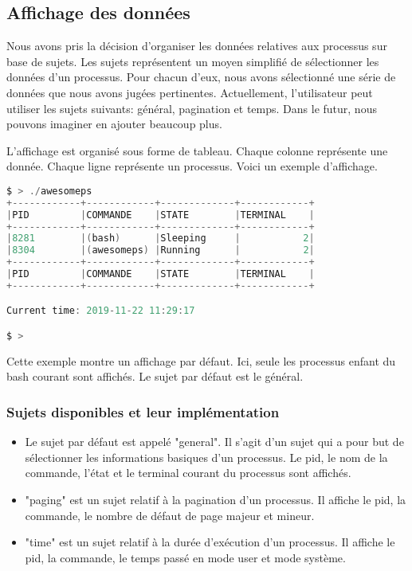 \subsection{Affichage des données}
Nous avons pris la décision d'organiser les données relatives aux processus sur base de sujets. Les sujets représentent un moyen simplifié de sélectionner les données d'un processus. Pour chacun d'eux, nous avons sélectionné une série de données que nous avons jugées pertinentes. Actuellement, l'utilisateur peut utiliser les sujets suivants: général, pagination et temps. Dans le futur, nous pouvons imaginer en ajouter beaucoup plus.

L'affichage est organisé sous forme de tableau. Chaque colonne représente une donnée. Chaque ligne représente un processus. Voici un exemple d'affichage.

\begin{lstlisting}[frame=single, language=c]
$ > ./awesomeps
+------------+------------+-------------+------------+
|PID         |COMMANDE    |STATE        |TERMINAL    |
+------------+------------+-------------+------------+
|8281        |(bash)      |Sleeping     |           2|
|8304        |(awesomeps) |Running      |           2|
+------------+------------+-------------+------------+
|PID         |COMMANDE    |STATE        |TERMINAL    |
+------------+------------+-------------+------------+

Current time: 2019-11-22 11:29:17

$ >
\end{lstlisting}

Cette exemple montre un affichage par défaut. Ici, seule les processus enfant du bash courant sont affichés. Le sujet par défaut est le général.

\subsubsection{Sujets disponibles et leur implémentation}
\begin{itemize}
\item Le sujet par défaut est appelé "general". Il s'agit d'un sujet qui a pour but de sélectionner les informations basiques d'un processus. Le pid, le nom de la commande, l'état et le terminal courant du processus sont affichés.

\item "paging" est un sujet relatif à la pagination d'un processus. Il affiche le pid, la commande, le nombre de défaut de page majeur et mineur.

\item "time" est un sujet relatif à la durée d'exécution d'un processus. Il affiche le pid, la commande, le temps passé en mode user et mode système.
\end{itemize}